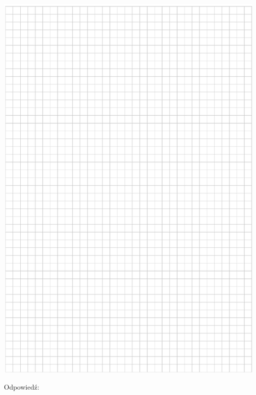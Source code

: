 \documentclass[10pt]{article}
\begin{document}
\includegraphics[max width=\textwidth, center]{2024_11_21_d9af6ed2d610d3f2d2cbg-13}

Odpowiedź:
\end{document}
